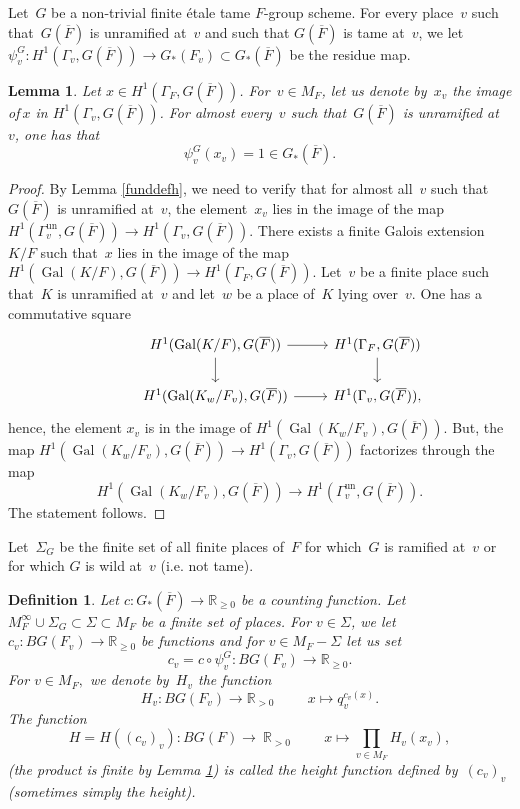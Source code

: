 \documentclass[a4paper,english,12pt]{amsart}
\newcommand{\RR}{\mathbb{R}}
\newcommand{\oF}{\overline F}
\newcommand{\Fv}{F_v}
\newcommand{\vMF}{v\in M_F}
\DeclareMathOperator{\Gal}{Gal}
\DeclareMathOperator{\un}{un}
\newtheorem{mydef}[equation]{Definition}
\newtheorem{lem}[equation]{Lemma}
\numberwithin{equation}{subsection}
\begin{document}
\subsubsection{} Let~$G$ be a non-trivial finite \' etale tame $F$-group scheme.  %
For every place~$v$ such that~$G(\oF)$ is unramified at~$v$ and such that $G(\oF)$ is tame at~$v$, we let $\psi^G_v:H^1(\Gamma_v, G(\oF))\to G_*(\Fv)\subset G_*(\oF)$ be the residue map. %
\begin{lem}\label{klasikatreba} Let $x\in H^1(\Gamma_F, G(\oF))$. For~$v\in M_F$, let us denote by~$x_v$ the image of$~x$ in $H^1(\Gamma_v, G(\oF))$. For almost every~$v$ such that~$G(\oF)$ is unramified at~$v$, one has that $$\psi^G_v(x_v)=1\in G_*(\oF).$$
\end{lem}
\begin{proof} By Lemma \ref{funddefh}, we need to verify that for almost all~$v$ such that~$G(\oF)$ is unramified at~$v$, the element~$x_v$ lies in the image of the map $H^1(\Gamma_v^{\un}, G(\oF))\to H^1(\Gamma_v, G(\oF))$. There exists a finite Galois extension $K/F$ such that~$x$ lies in the image of the map $H^1(\Gal(K/F), G(\oF))\to H^1(\Gamma_F, G(\oF)).$ Let~$v$ be a finite place such that~$K$ is unramified at~$v$ and let~$w$ be a place of~$K$ lying over~$v$. One has a commutative square 
\[\begin{tikzcd}
	& {H^1(\Gal(K/F), G(\oF))} & {H^1(\Gamma_F, G(\oF))} \\
	{} & {H^1(\Gal(K_w/F_v), G(\oF))} & {H^1(\Gamma_v, G(\oF)),}
	\arrow[from=1-2, to=2-2]
	\arrow[from=2-2, to=2-3]
	\arrow[from=1-3, to=2-3]
	\arrow[from=1-2, to=1-3]
\end{tikzcd}\]
hence, the element $x_v$ is in the image of $H^1(\Gal(K_w/F_v), G(\oF))$. But, the map $H^1(\Gal(K_w/F_v), G(\oF))\to H^1(\Gamma_v, G(\oF))$ factorizes through the map $$H^1(\Gal(K_w/F_v), G(\oF))\to H^1(\Gamma_v^{\un}, G(\oF)).$$ The statement follows.
\end{proof}
Let~$\Sigma_G$ be the finite set of all finite places of~$F$ for which~$G$ is ramified at~$v$ or for which $G$ is wild at~$v$ (i.e. not tame). 
\begin{mydef}\label{definitionofheight}Let $c:G_*(\overline F)\to\RR_{\geq 0}$ be a counting function. Let $M_F^{\infty}\cup \Sigma_G\subset\Sigma\subset M_F$ be a finite set of places.  For $v\in\Sigma$, we let $c_v: BG(F_v)\to\RR_{\geq 0}$ be functions and for $v\in M_F-\Sigma$ let us set $$c_v=c\circ \psi^G_v:BG(F_v)\to \RR_{\geq 0}.$$ For $v\in M_F,$ we denote by~$H_v$ the function $$H_v:BG(F_v)\to\RR_{>0}\hspace{1cm} x\mapsto q_v^{c_v(x)}.$$ The function $$H=H((c_v)_v):BG(F)\to ~\RR_{>0}\hspace{1cm}x\mapsto\prod_{\vMF}H_v(x_v),$$(the product is finite by Lemma \ref{klasikatreba}) is called the height function defined by~$(c_v)_v$ (sometimes simply the height).
\end{mydef}
\end{document}
